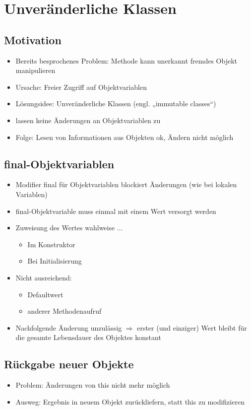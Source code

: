 \section{Unveränderliche Klassen}

\subsection{Motivation}
\begin{itemize}
\item Bereits besprochenes Problem: Methode kann unerkannt fremdes Objekt manipulieren
\item Ursache: Freier Zugriff auf Objektvariablen
\item Lösungsidee: Unveränderliche Klassen (engl. „immutable classes“)
\item lassen keine Änderungen an Objektvariablen zu
\item Folge: Lesen von Informationen aus Objekten ok, Ändern nicht möglich
\end{itemize}

\subsection{final-Objektvariablen}
\begin{itemize}
\item Modifier final für Objektvariablen blockiert Änderungen (wie bei lokalen Variablen)
\item final-Objektvariable muss einmal mit einem Wert versorgt werden
\item Zuweisung des Wertes wahlweise ...
\begin{itemize}
	\item  Im Konstruktor
	\item Bei Initialisierung
\end{itemize}
\item  Nicht ausreichend:
\begin{itemize}
\item Defaultwert
\item anderer Methodenaufruf
\end{itemize}
\item Nachfolgende Änderung unzulässig $\Rightarrow$ erster (und einziger) Wert bleibt für die gesamte Lebensdauer des Objektes konstant
\end{itemize}

\subsection{Rückgabe neuer Objekte}
\begin{itemize}
\item Problem: Änderungen von this nicht mehr möglich
\item Ausweg: Ergebnis in neuem Objekt zurückliefern, statt this zu modifizieren
\end{itemize}
%
%
%

